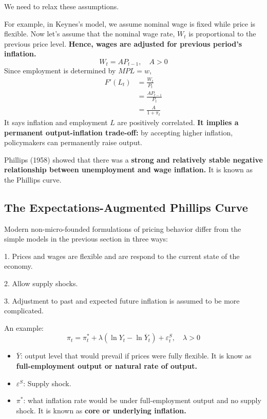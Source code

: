 \documentclass[12pt]{article}
\begin{document}
We need to relax these assumptions.

For example, in Keynes's model, we assume nominal wage is fixed while price is flexible.
Now let's assume that the nominal wage rate, $ W_{t} $ is proportional to the previous
price level.
{\textbf {Hence, wages are adjusted for previous period's inflation.}}
\begin{equation*}
W_{t} = AP_{t - 1},\quad A > 0
\end{equation*}
Since employment is determined by $ MPL = w $, 
\begin{align*}
F'(L_{t})&= \frac{W_{t}}{P_{t}}\\
&= \frac{AP_{t - 1}}{P_{t}}\\
&= \frac{A}{1 + \pi_{t}}
\end{align*}
It says inflation and employment $ L $ are positively correlated.
{\textbf {It implies a permanent output-inflation trade-off:}} by accepting higher 
inflation, policymakers can permanently raise output.


Phillips (1958) showed that there was a {\textbf {strong  and relatively stable 
negative relationship between unemployment and wage inflation.}}
It is known as the Phillips curve.


\subsection{The Expectations-Augmented Phillips Curve}
Modern non-micro-founded formulations of pricing behavior differ from the simple
models in the previous section in three ways:

1. Prices and wages are flexible and are respond to the current state of the economy.

2. Allow supply shocks.

3. Adjustment to past and expected future inflation is assumed to be more complicated.

An example:
\begin{equation}
\label{eqn:augmented PHILLIPS}
\pi_{t} = \pi_{t}^{*} + \lambda(\ln Y_{t} - \ln  \overline{Y}_{t}) + \varepsilon_{t}^{S}
,\quad \lambda > 0
\end{equation}
\begin{itemize}
\item $  \overline{Y} $: output level that would prevail if prices were fully flexible.
		It is know as {\textbf {full-employment output or natural rate of output.}}
\item $ \varepsilon^{S} $: Supply shock.
\item $ \pi^{*} $: what inflation rate would be under full-employment output and no
		supply shock. It is known as {\textbf {core or  underlying inflation.}}
\end{itemize}
\end{document}
